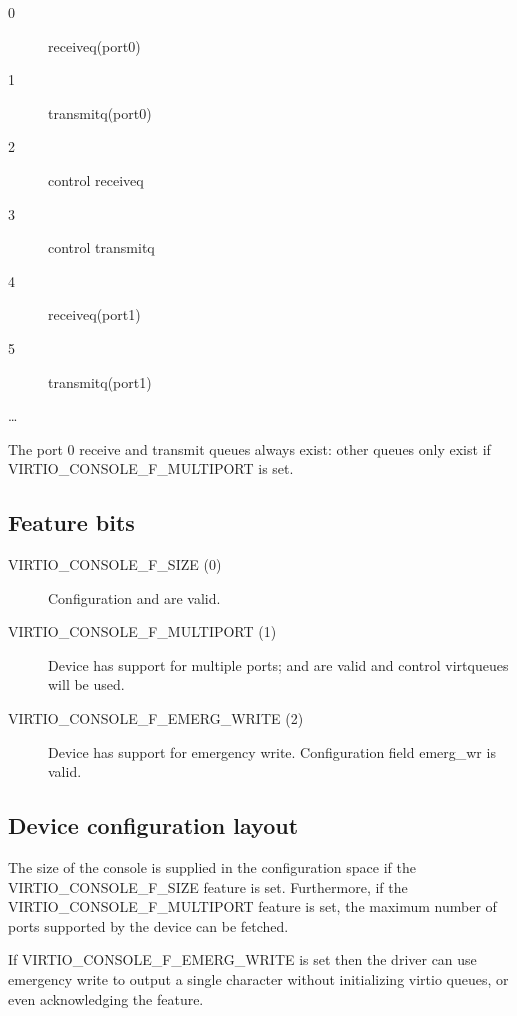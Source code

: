 \begin{description}
\item[0] receiveq(port0)
\item[1] transmitq(port0)
\item[2] control receiveq
\item[3] control transmitq
\item[4] receiveq(port1)
\item[5] transmitq(port1)
\item[\ldots]
\end{description}

The port 0 receive and transmit queues always exist: other queues
only exist if VIRTIO_CONSOLE_F_MULTIPORT is set.

\subsection{Feature bits}\label{sec:Device Types / Console Device / Feature bits}

\begin{description}
\item[VIRTIO_CONSOLE_F_SIZE (0)] Configuration  and 
    are valid.

\item[VIRTIO_CONSOLE_F_MULTIPORT (1)] Device has support for multiple
    ports;  and  are
    valid and control virtqueues will be used.

\item[VIRTIO_CONSOLE_F_EMERG_WRITE (2)] Device has support for emergency write.
    Configuration field emerg_wr is valid.
\end{description}

\subsection{Device configuration layout}\label{sec:Device Types / Console Device / Device configuration layout}

  The size of the console is supplied
  in the configuration space if the VIRTIO_CONSOLE_F_SIZE feature
  is set. Furthermore, if the VIRTIO_CONSOLE_F_MULTIPORT feature
  is set, the maximum number of ports supported by the device can
  be fetched.

  If VIRTIO_CONSOLE_F_EMERG_WRITE is set then the driver can use emergency write
  to output a single character without initializing virtio queues, or even
  acknowledging the feature.

